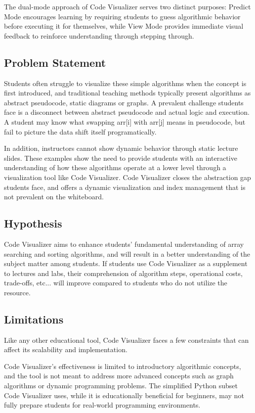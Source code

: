 \documentclass{IEEEtran}
\begin{document}
The dual-mode approach of Code Visualizer serves two distinct purposes: Predict Mode encourages learning by requiring students to guess algorithmic behavior before executing it for themselves, while View Mode provides immediate visual feedback to reinforce understanding through stepping through.
\subsection{Problem Statement}
Students often struggle to visualize these simple algorithms when the concept is first introduced, and traditional teaching methods typically present algorithms as abstract pseudocode, static diagrams or graphs. A prevalent challenge students face is a disconnect between abstract pseudocode and actual logic and execution. A student may know what swapping arr[i] with arr[j] means in pseudocode, but fail to picture the data shift itself programatically.

In addition, instructors cannot show dynamic behavior through static lecture slides. These examples show the need to provide students with an interactive understanding of how these algorithms operate at a lower level through a visualization tool like Code Visualizer. Code Visualizer closes the abstraction gap students face, and offers a dynamic visualization and index management that is not prevalent on the whiteboard.
\subsection{Hypothesis}
Code Visualizer aims to enhance students' fundamental understanding of array searching and sorting algorithms, and will result in a better understanding of the subject matter among students. If students use Code Visualizer as a supplement to lectures and labs, their comprehension of algorithm steps, operational costs, trade-offs, etc... will improve compared to students who do not utilize the resource.
\subsection{Limitations}
Like any other educational tool, Code Visualizer faces a few constraints that can affect its scalability and implementation.

Code Visualizer's effectiveness is limited to introductory algorithmic concepts, and the tool is not meant to address more advanced concepts such as graph algorithms or dynamic programming problems. The simplified Python subset Code Visualizer uses, while it is educationally beneficial for beginners, may not fully prepare students for real-world programming environments.
\end{document}
